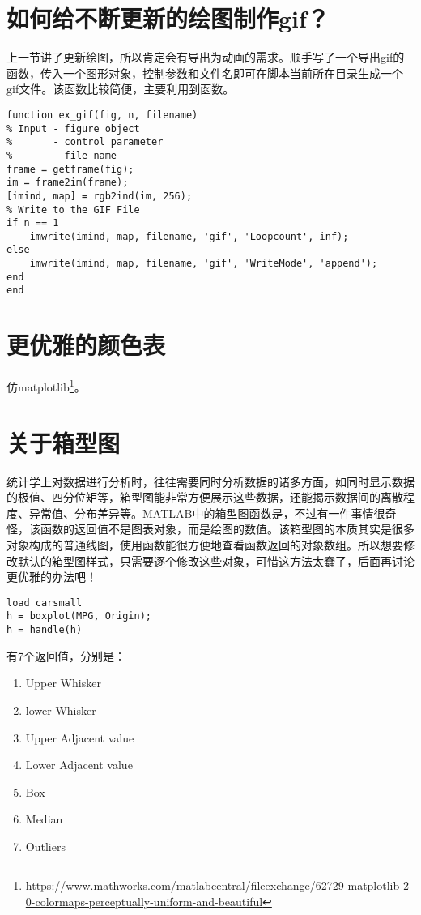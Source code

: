 \section{如何给不断更新的绘图制作gif？}

上一节讲了更新绘图，所以肯定会有导出为动画的需求。顺手写了一个导出gif的函数，传入一个图形对象，控制参数和文件名即可在脚本当前所在目录生成一个gif文件。该函数比较简便，主要利用到函数。

\begin{verbatim}
function ex_gif(fig, n, filename)
% Input - figure object
%       - control parameter
%       - file name
frame = getframe(fig);
im = frame2im(frame);
[imind, map] = rgb2ind(im, 256);
% Write to the GIF File
if n == 1
    imwrite(imind, map, filename, 'gif', 'Loopcount', inf);
else
    imwrite(imind, map, filename, 'gif', 'WriteMode', 'append');
end
end
\end{verbatim}


\section{更优雅的颜色表}

仿matplotlib\footnote{\url{https://www.mathworks.com/matlabcentral/fileexchange/62729-matplotlib-2-0-colormaps-perceptually-uniform-and-beautiful}}。

\section{关于箱型图}

统计学上对数据进行分析时，往往需要同时分析数据的诸多方面，如同时显示数据的极值、四分位矩等，箱型图能非常方便展示这些数据，还能揭示数据间的离散程度、异常值、分布差异等。MATLAB中的箱型图函数是，不过有一件事情很奇怪，该函数的返回值不是图表对象，而是绘图的数值。该箱型图的本质其实是很多对象构成的普通线图，使用函数能很方便地查看函数返回的对象数组。所以想要修改默认的箱型图样式，只需要逐个修改这些对象，可惜这方法太蠢了，后面再讨论更优雅的办法吧！

\begin{verbatim}
load carsmall
h = boxplot(MPG, Origin);
h = handle(h)
\end{verbatim}

有7个返回值，分别是：

\begin{enumerate}
    \item Upper Whisker
    \item lower Whisker
    \item Upper Adjacent value
    \item Lower Adjacent value
    \item Box
    \item Median
    \item Outliers
\end{enumerate}

